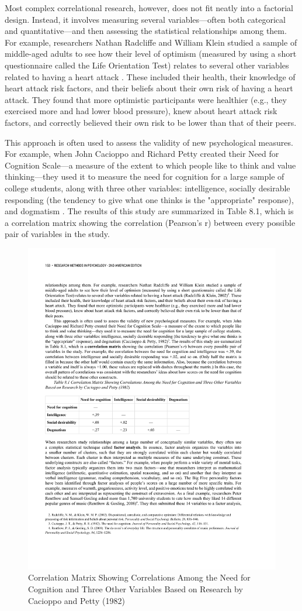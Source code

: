 Most complex correlational research, however, does not fit neatly into a factorial design. Instead, it involves measuring several variables---often both categorical and quantitative---and then assessing the statistical relationships among them. For example, researchers Nathan Radcliffe and William Klein studied a sample of middle-aged adults to see how their level of optimism (measured by using a short questionnaire called the Life Orientation Test) relates to several other variables related to having a heart attack \citep{radcliffe_dispositional_2002}. These included their health, their knowledge of heart attack risk factors, and their beliefs about their own risk of having a heart attack. They found that more optimistic participants were healthier (e.g., they exercised more and had lower blood pressure), knew about heart attack risk factors, and correctly believed their own risk to be lower than that of their peers.

This approach is often used to assess the validity of new psychological measures. For example, when John Cacioppo and Richard Petty created their Need for Cognition Scale---a measure of the extent to which people like to think and value thinking---they used it to measure the need for cognition for a large sample of college students, along with three other variables: intelligence, socially desirable responding (the tendency to give what one thinks is the "appropriate" response), and dogmatism \citep{cacioppo_need_1982}. The results of this study are summarized in Table 8.1, which is a correlation matrix showing the correlation (Pearson's r) between every possible pair of variables in the study.

\begin{figure}

\includegraphics[width=.7\linewidth]{figures/C8need.pdf}

\caption{Correlation Matrix Showing Correlations Among the Need for Cognition and Three Other Variables Based on Research by Cacioppo and Petty (1982)}

\label{fig:need}

\end{figure}

